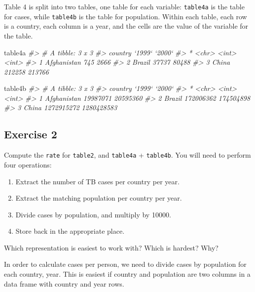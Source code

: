 \documentclass[]{book}
\newenvironment{Shaded}{\begin{snugshade}}{\end{snugshade}}
\newcommand{\CommentTok}[1]{\textcolor[rgb]{0.56,0.35,0.01}{\textit{#1}}}
\newcommand{\NormalTok}[1]{#1}
\providecommand{\tightlist}{%
  \setlength{\itemsep}{0pt}\setlength{\parskip}{0pt}}
\theoremstyle{plain}
\theoremstyle{remark}
\theoremstyle{definition}
\theoremstyle{definition}
\theoremstyle{definition}
\theoremstyle{remark}
\begin{document}
Table 4 is split into two tables, one table for each variable:
\texttt{table4a} is the table for cases, while \texttt{table4b} is the
table for population. Within each table, each row is a country, each
column is a year, and the cells are the value of the variable for the
table.

\begin{Shaded}
\begin{Highlighting}[]
\NormalTok{table4a}
\CommentTok{#> # A tibble: 3 x 3}
\CommentTok{#>   country     `1999` `2000`}
\CommentTok{#> * <chr>        <int>  <int>}
\CommentTok{#> 1 Afghanistan    745   2666}
\CommentTok{#> 2 Brazil       37737  80488}
\CommentTok{#> 3 China       212258 213766}
\end{Highlighting}
\end{Shaded}

\begin{Shaded}
\begin{Highlighting}[]
\NormalTok{table4b}
\CommentTok{#> # A tibble: 3 x 3}
\CommentTok{#>   country         `1999`     `2000`}
\CommentTok{#> * <chr>            <int>      <int>}
\CommentTok{#> 1 Afghanistan   19987071   20595360}
\CommentTok{#> 2 Brazil       172006362  174504898}
\CommentTok{#> 3 China       1272915272 1280428583}
\end{Highlighting}
\end{Shaded}

\hypertarget{exercise-2-20}{%
\subsection{Exercise 2}\label{exercise-2-20}}

Compute the \texttt{rate} for \texttt{table2}, and \texttt{table4a} +
\texttt{table4b}. You will need to perform four operations:

\begin{enumerate}
\def\labelenumi{\arabic{enumi}.}
\tightlist
\item
  Extract the number of TB cases per country per year.
\item
  Extract the matching population per country per year.
\item
  Divide cases by population, and multiply by 10000.
\item
  Store back in the appropriate place.
\end{enumerate}

Which representation is easiest to work with? Which is hardest? Why?

In order to calculate cases per person, we need to divide cases by
population for each country, year. This is easiest if country and
population are two columns in a data frame with country and year rows.
\end{document}
